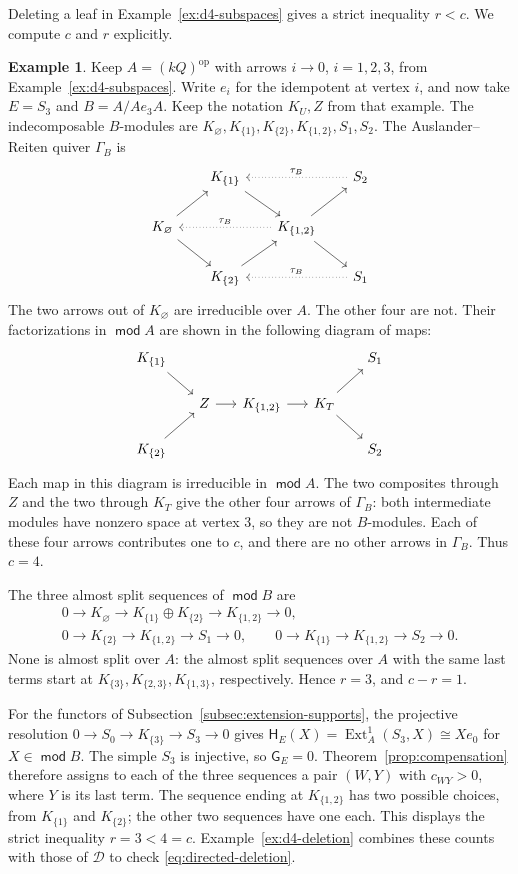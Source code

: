 \documentclass[a4paper,reqno,10pt]{amsart}
\theoremstyle{definition}
\newtheorem{example}[theorem]{Example}
\numberwithin{equation}{section}
\DeclareMathOperator{\moduleCategory}{\mathsf{mod}}
\renewcommand{\mod}{\moduleCategory}
\DeclareMathOperator{\Ext}{Ext}
\newcommand{\op}{\mathrm{op}}
\newcommand{\cD}{\mathcal D}
\begin{document}
Deleting a leaf in Example~\ref{ex:d4-subspaces} gives a strict inequality
\(r<c\). We compute \(c\) and \(r\) explicitly.
\begin{example}\label{ex:d4-boundary}
Keep \(A=(kQ)^\op\) with arrows \(i\to0\), \(i=1,2,3\), from
Example~\ref{ex:d4-subspaces}. Write \(e_i\) for the idempotent at vertex
\(i\), and now take \(E=S_3\) and \(B=A/Ae_3A\).
Keep the notation \(K_U,Z\) from that example.
The indecomposable \(B\)-modules are \(K_\varnothing,K_{\{1\}},K_{\{2\}},
K_{\{1,2\}},S_1,S_2\). The Auslander--Reiten quiver \(\Gamma_B\) is
\[
\begin{tikzcd}[column sep=1.8em,row sep=1.8em]
 &K_{\{1\}}\arrow[dr]&&S_2\arrow[ll,dotted,"\tau_B"']\\
 K_\varnothing\arrow[ur]\arrow[dr]&&K_{\{1,2\}}\arrow[ur]\arrow[dr]
   \arrow[ll,dotted,"\tau_B"']&\\
 &K_{\{2\}}\arrow[ur]&&S_1\arrow[ll,dotted,"\tau_B"']
\end{tikzcd}
\]
The two arrows out of \(K_\varnothing\) are irreducible over \(A\).
The other four are not. Their factorizations in \(\mod A\) are shown
in the following diagram of maps:
\[
\begin{tikzcd}[column sep=1.5em,row sep=1.5em]
 K_{\{1\}}\arrow[dr]&&&&S_1\\
 &Z\arrow[r]&K_{\{1,2\}}\arrow[r]&K_T\arrow[ur]\arrow[dr]&\\
 K_{\{2\}}\arrow[ur]&&&&S_2
\end{tikzcd}
\]
Each map in this diagram is irreducible in \(\mod A\). The two composites
through \(Z\) and the two through \(K_T\) give the other four
arrows of \(\Gamma_B\): both intermediate modules have nonzero space at
vertex 3, so they are not \(B\)-modules. Each of these four arrows
contributes one to \(c\), and there are no other arrows in \(\Gamma_B\).
Thus \(c=4\).

The three almost split sequences of \(\mod B\) are
\[
\begin{gathered}
0\to K_\varnothing\to K_{\{1\}}\oplus K_{\{2\}}
  \to K_{\{1,2\}}\to0,\\
0\to K_{\{2\}}\to K_{\{1,2\}}\to S_1\to0,\qquad
0\to K_{\{1\}}\to K_{\{1,2\}}\to S_2\to0.
\end{gathered}
\]
None is almost split over \(A\): the almost split sequences over
\(A\) with the same last terms start at \(K_{\{3\}},K_{\{2,3\}},K_{\{1,3\}}\), respectively.
Hence \(r=3\), and \(c-r=1\).

For the functors of Subsection~\ref{subsec:extension-supports}, the
projective resolution \(0\to S_0\to K_{\{3\}}\to S_3\to0\) gives
\(\mathsf H_E(X)=\Ext_A^1(S_3,X)\cong Xe_0\) for \(X\in\mod B\).
The simple \(S_3\) is injective, so \(\mathsf G_E=0\).
Theorem~\ref{prop:compensation} therefore assigns to each of the three
sequences a pair \((W,Y)\) with \(c_{WY}>0\), where \(Y\) is its last term. The sequence ending at \(K_{\{1,2\}}\)
has two possible choices, from \(K_{\{1\}}\) and \(K_{\{2\}}\);
the other two sequences have one each. This displays the strict inequality
\(r=3<4=c\).
Example~\ref{ex:d4-deletion} combines these counts with those of
\(\cD\) to check \eqref{eq:directed-deletion}.
\end{example}
\end{document}
